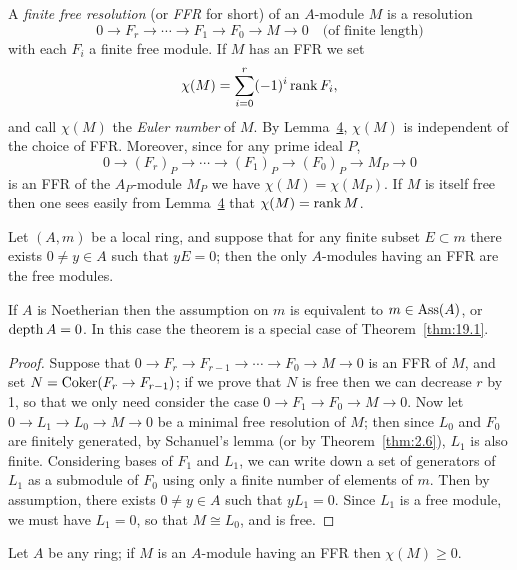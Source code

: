 A \emph{finite free resolution} (or \emph{FFR} for short) of an $A$-module $M$ is a
resolution
\[
  0 \to F_r \to \cdots \to F_1 \to F_0 \to M \to 0 \quad \text{(of finite length)}
\]
with each $F_i$ a finite free module. If $M$ has an FFR we set
\[
  \chi(M) = \sum_{i=0}^{r} (-1)^i \operatorname{rank} F_i,
\]
and call $\chi(M)$ the \emph{Euler number} of $M$. By Lemma~\hyperref[lem:19.4]{4},
$\chi(M)$ is independent of the choice of FFR. Moreover, since for any prime
ideal $P$,
\[
  0 \to (F_r)_P \to \cdots \to (F_1)_P \to (F_0)_P \to M_P \to 0
\]
is an FFR of the $A_P$-module $M_P$ we have $\chi(M) = \chi(M_P)$. If $M$ is itself
free then one sees easily from Lemma~\hyperref[lem:19.4]{4} that $\chi(M) = \operatorname{rank} M$.

\begin{theorem}\label{thm:19.6}
Let $(A, m)$ be a local ring, and suppose that for any finite
subset $E \subset m$ there exists $0 \neq y \in A$ such that $yE = 0$; then the only
$A$-modules having an FFR are the free modules.
\end{theorem}

\begin{remark}
If $A$ is Noetherian then the assumption on $m$ is equivalent to
$m \in \operatorname{Ass}(A)$, or $\operatorname{depth} A = 0$. In this case the theorem is a special case of
Theorem~\ref{thm:19.1}.
\end{remark}

\begin{proof}
Suppose that $0 \to F_r \to F_{r-1} \to \cdots \to F_0 \to M \to 0$ is an FFR
of $M$, and set $N = \operatorname{Coker}(F_r \to F_{r-1})$; if we prove that $N$ is free then
we can decrease $r$ by 1, so that we only need consider the case $0 \to
F_1 \to F_0 \to M \to 0$. Now let $0 \to L_1 \to L_0 \to M \to 0$ be a minimal
free resolution of $M$; then since $L_0$ and $F_0$ are finitely generated, by
Schanuel's lemma (or by Theorem~\ref{thm:2.6}), $L_1$ is also finite. Considering bases of
$F_1$ and $L_1$, we can write down a set of generators of $L_1$ as a submodule of
$F_0$ using only a finite number of elements of $m$. Then by assumption, there
exists $0 \neq y \in A$ such that $yL_1 = 0$. Since $L_1$ is a free module, we must
have $L_1 = 0$, so that $M \cong L_0$, and is free.
\end{proof}

\begin{theorem}\label{thm:19.7}
Let $A$ be any ring; if $M$ is an $A$-module having an FFR then
$\chi(M) \ge 0$.
\end{theorem}

